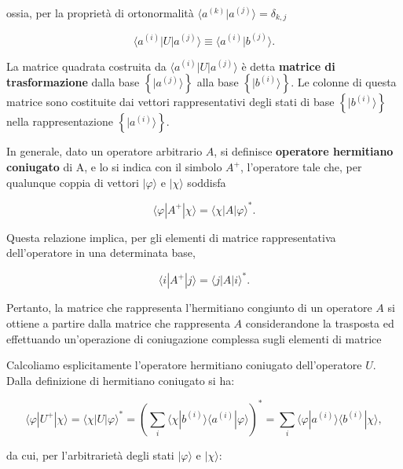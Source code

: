 ossia, per la proprietà di ortonormalità $\langle a^{(k)} | a^{(j)} \rangle  =\delta_{k,j}$

\begin{equation}
\langle a^{(i)} | U | a^{(j)} \rangle \equiv \langle a^{(i)} | b^{(j)} \rangle .
\end{equation}

La matrice quadrata costruita da $\langle a^{(i)} | U | a^{(j)} \rangle $ è detta \textbf{matrice di trasformazione} dalla base $\left\{ | a^{(j)} \rangle  \right\}$ alla base $\left\{ | b^{(i)} \rangle  \right\}$. Le colonne di questa matrice sono costituite dai vettori rappresentativi degli stati di base $\left\{ | b^{(i)} \rangle  \right\}$ nella rappresentazione $\left\{ | a^{(i)} \rangle  \right\}$.

In generale, dato un operatore arbitrario $A$, si definisce \textbf{operatore hermitiano coniugato} di A, e lo si indica con il simbolo $A^+$, l'operatore tale che, per qualunque coppia di vettori $| \varphi \rangle$ e $ | \chi \rangle $ soddisfa

\begin{equation}
\langle \varphi | A^{+} | \chi \rangle = \langle \chi | A | \varphi \rangle ^* .
\label{cap3_13}
\end{equation}

Questa relazione implica, per gli elementi di matrice rappresentativa dell'operatore in una determinata base,

\begin{equation}
\langle i | A^{+} | j \rangle = \langle j | A | i \rangle ^* .
\end{equation}

Pertanto, la matrice che rappresenta l'hermitiano congiunto di un operatore $A$ si ottiene a partire dalla matrice che rappresenta $A$ considerandone la trasposta ed effettuando un'operazione di coniugazione complessa sugli elementi di matrice


Calcoliamo esplicitamente l'operatore hermitiano coniugato dell'operatore $U$. Dalla definizione di hermitiano coniugato si ha:

\begin{equation}
\langle \varphi | U^{+} | \chi \rangle = \langle \chi | U | \varphi \rangle ^* =  \left( \sum \limits_{i} \langle \chi | b^{(i)} \rangle \langle a^{(i)} | \varphi \rangle \right)^* =\sum \limits_{i} \langle \varphi | a^{(i)}\rangle \langle b^{(i)} | \chi \rangle ,
\end{equation}

da cui, per l'arbitrarietà degli stati $| \varphi \rangle $ e $| \chi \rangle $:

